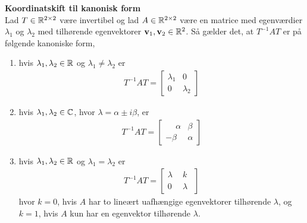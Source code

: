 \begin{thmx}\textbf{Koordinatskift til kanonisk form}\\
    Lad $T\in\mathbb{R}^{2\times 2}$ være invertibel og lad $A\in \mathbb{R}^{2\times 2}$ være en matrice med egenværdier $\lambda_1$ og $\lambda_2$ med tilhørende egenvektorer $\textbf{v}_1, \textbf{v}_2\in \mathbb{R}^2$. Så gælder det, at $T^{-1}AT$ er på følgende kanoniske form,
    
    
    \begin{enumerate}
        
        \item hvis $\lambda_1,\lambda_2 \in \mathbb{R}$ og $\lambda_1 \neq \lambda_2$ er 
        \begin{align*}
            T^{-1}AT = \begin{bmatrix}
                            \lambda_1   &  0\\
                            0           &  \lambda_2
                        \end{bmatrix}
        \end{align*}
        
        \item hvis $\lambda_1, \lambda_2 \in \mathbb{C}$, hvor $\lambda = \alpha \pm i \beta$, er
        \begin{align*}
            T^{-1}AT = \begin{bmatrix}
                            \phantom{-}\alpha &  \beta\\
                            - \beta           &  \alpha
                        \end{bmatrix}
        \end{align*}
        
        \item hvis $\lambda_1, \lambda_2 \in \mathbb{R}$ og $\lambda_1 = \lambda_2$ er 
        \begin{align*}
            T^{-1}AT = \begin{bmatrix}
                            \lambda\phantom{_1}   &  k\phantom{_1}\\
                            0\phantom{_2}           &  \lambda\phantom{_2}
                        \end{bmatrix}
        \end{align*}
        hvor $k=0$, hvis $A$ har to lineært uafhængige egenvektorer tilhørende $\lambda$, og $k=1$, hvis $A$ kun har en egenvektor tilhørende $\lambda$.
    \end{enumerate}
\end{thmx}

